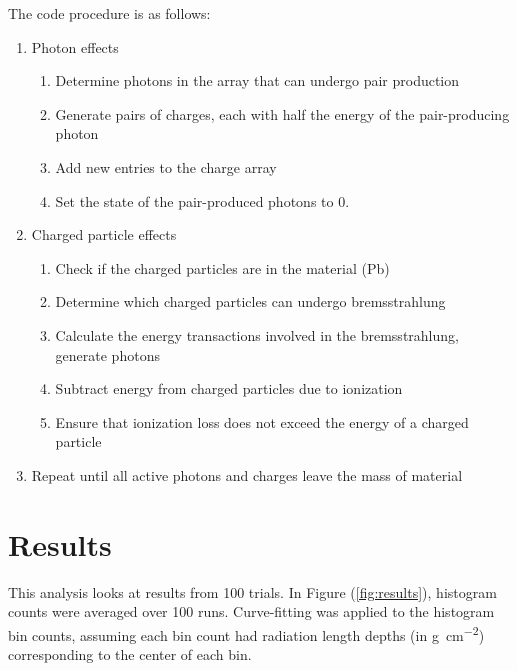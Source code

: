 \documentclass{article}
\newcommand{\radlen}{\gram\per\cm^2}
\begin{document}
The code procedure is as follows:
\begin{enumerate}
    \item Photon effects
        \begin{enumerate}
            \item Determine photons in the array that can undergo pair production
            \item Generate pairs of charges, each with half the energy of the pair-producing photon
            \item Add new entries to the charge array
            \item Set the state of the pair-produced photons to 0.
        \end{enumerate}
    \item Charged particle effects
        \begin{enumerate}
            \item Check if the charged particles are in the material (Pb)
            \item Determine which charged particles can undergo bremsstrahlung
            \item Calculate the energy transactions involved in the bremsstrahlung, generate photons
            \item Subtract energy from charged particles due to ionization
            \item Ensure that ionization loss does not exceed the energy of a charged particle
        \end{enumerate}
    \item Repeat until all active photons and charges leave the mass of material
\end{enumerate}


\section{Results} %
\label{sec:Results}

\iffalse
\begin{figure}[htpb]
    \begin{center}
        \texttt{[image: figures/charged\_depth\_hist.pdf]}
    \end{center}
    \caption{Histogram of charged particle radiation lengths}\label{fig:hist}
\end{figure}
\fi

This analysis looks at results from 100 trials. In Figure (\ref{fig:results}), histogram counts were averaged over 100 runs. Curve-fitting was applied to the histogram bin counts, assuming each bin count had radiation length depths (in \unit{\radlen}) corresponding to the center of each bin. 
\end{document}
